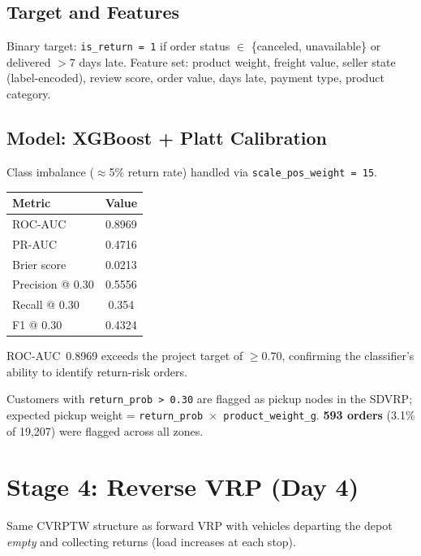 \documentclass[11pt,a4paper]{article}
\begin{document}
\subsection{Target and Features}
Binary target: \texttt{is\_return = 1} if order status
$\in$ \{canceled, unavailable\} or delivered $>7$ days late.
Feature set: product weight, freight value, seller state (label-encoded),
review score, order value, days late, payment type, product category.

\subsection{Model: XGBoost + Platt Calibration}
Class imbalance ($\approx$5\% return rate) handled via
\texttt{scale\_pos\_weight = 15}.

\begin{tabular}{lc}
\toprule
\textbf{Metric} & \textbf{Value} \\
\midrule
ROC-AUC   & 0.8969 \\
PR-AUC    & 0.4716 \\
Brier score & 0.0213 \\
Precision @ 0.30 & 0.5556 \\
Recall @ 0.30    & 0.354 \\
F1 @ 0.30        & 0.4324 \\
\bottomrule
\end{tabular}

ROC-AUC~0.8969 exceeds the project target of $\geq 0.70$, confirming
the classifier's ability to identify return-risk orders.

Customers with \texttt{return\_prob > 0.30} are flagged as pickup nodes
in the SDVRP; expected pickup weight = \texttt{return\_prob $\times$
product\_weight\_g}.
\textbf{593 orders} (3.1\% of 19,207) were flagged across all zones.

\section{Stage 4: Reverse VRP (Day 4)}

Same CVRPTW structure as forward VRP with vehicles departing the depot
\emph{empty} and collecting returns (load increases at each stop).
\end{document}
